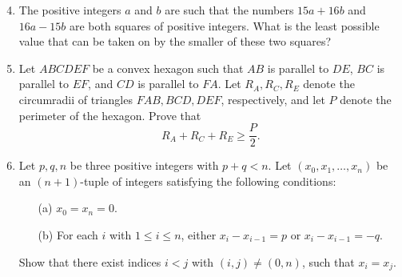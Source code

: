 \documentclass[12pt]{article}
\begin{document}
\vspace*{.3in}

\begin{enumerate}
\setcounter{enumi}{3}
\item %
The positive integers $a$ and $b$ are such that the numbers $15a + 
16b$ and $16a - 15b$ are both squares of positive integers. What is 
the least possible value that can be taken on by the smaller of these 
two squares?

\item %
Let $ABCDEF$ be a convex hexagon such that $AB$ is parallel to $DE$, $BC$ 
is parallel to $EF$, and $CD$ is parallel to $FA$. Let $R_A, R_C, R_E$ 
denote the circumradii of triangles $FAB, BCD, DEF$, respectively, and 
let $P$ denote the perimeter of the hexagon. Prove that
\[
R_A + R_C + R_E  \geq \frac{P}{2}.
\]

\item %
Let $p,q,n$ be three positive integers with $p+q < n$. Let $(x_{0}, 
x_{1}, \dots, x_{n})$ be an $(n+1)$-tuple of integers satisfying the 
following conditions:
\begin{enumerate}
\item[(a)] $x_{0} = x_{n} = 0$.
\item[(b)] For each $i$ with $1 \leq i \leq n$, either $x_{i} - 
x_{i-1} = p$ or $x_{i} - x_{i-1} = -q$.
\end{enumerate}
Show that there exist indices $i < j$ with $(i,j) 
\neq (0, n)$, such that $x_{i} = x_{j}$.


\end{enumerate}
\end{document}
